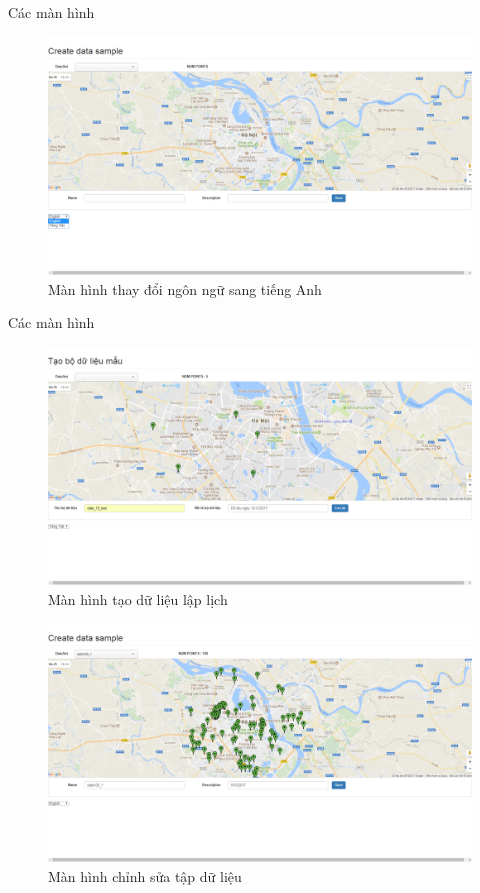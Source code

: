 \documentclass[compress]{beamer}
\begin{document}
\begin{frame}{Các màn hình}
\begin{figure}

\includegraphics[scale=0.25]{screen/changeLanguage.png}
\caption{Màn hình thay đổi ngôn ngữ sang tiếng Anh}
\label{changelanguage}
\end{figure}
\end{frame}
\begin{frame}{Các màn hình}
\begin{figure}

\includegraphics[scale=0.25]{screen/makedata.png}
\caption{Màn hình tạo dữ liệu lập lịch}
\label{makedata}
\end{figure}
\begin{figure}

\includegraphics[scale=0.25]{screen/editdata.png}
\caption{Màn hình chỉnh sửa tập dữ liệu}
\label{editdata}
\end{figure}
\end{frame}
\end{document}

